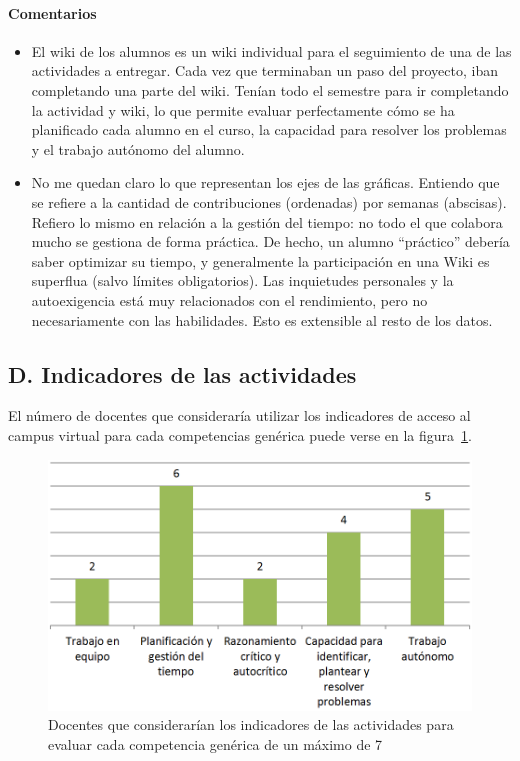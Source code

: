 \paragraph*{Comentarios}

\begin{itemize}
\item El wiki de los alumnos es un wiki individual para el seguimiento de una de las actividades a entregar. Cada vez que terminaban un paso del proyecto, iban completando una parte del wiki. Tenían todo el semestre para ir completando la actividad y wiki, lo que permite evaluar perfectamente cómo se ha planificado cada alumno en el curso, la capacidad para resolver los problemas y el trabajo autónomo del alumno.
\item No me quedan claro lo que representan los ejes de las gráficas. Entiendo que se refiere a la cantidad de contribuciones (ordenadas) por semanas (abscisas). Refiero lo mismo en relación a la gestión del tiempo: no todo el que colabora mucho se gestiona de forma práctica. De hecho, un alumno ``práctico'' debería saber optimizar su tiempo, y generalmente la participación en una Wiki es superflua (salvo límites obligatorios). Las inquietudes personales y la autoexigencia está muy relacionados con el rendimiento, pero no necesariamente con las habilidades. Esto es extensible al resto de los datos.
\end{itemize}

	\subsection*{D. Indicadores de las actividades}

El número de docentes que consideraría utilizar los indicadores de acceso al campus virtual para cada competencias genérica puede verse en la figura~\ref{fig:ape:aa:actividades}.

\begin{figure}[ht]
    \includegraphics[scale=0.4]{aa-actividades.png}
  \caption{Docentes que considerarían los indicadores de las actividades para evaluar cada competencia genérica de un máximo de 7}
  \label{fig:ape:aa:actividades}
\end{figure}

